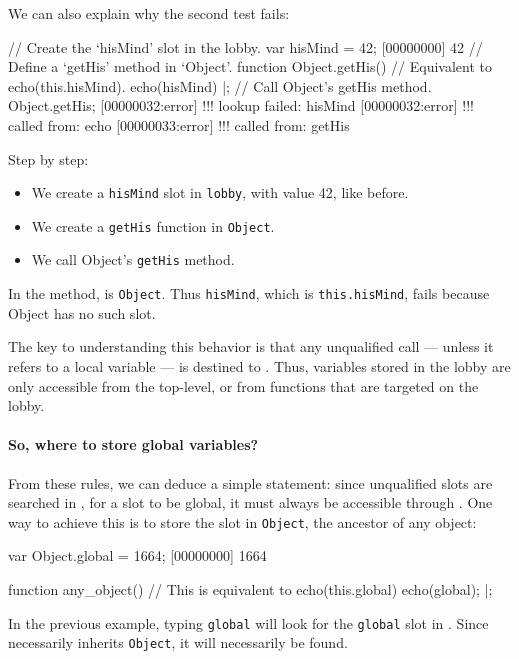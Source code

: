 We can also explain why the second test fails:

\begin{urbiscript}
// Create the `hisMind' slot in the lobby.
var hisMind = 42;
[00000000] 42
// Define a `getHis' method in `Object'.
function Object.getHis()
{
  // Equivalent to echo(this.hisMind).
  echo(hisMind)
}|;
// Call Object's getHis method.
Object.getHis;
[00000032:error] !!! lookup failed: hisMind
[00000032:error] !!!    called from: echo
[00000033:error] !!!    called from: getHis
\end{urbiscript}

Step by step:
\begin{itemize}
\item We create a \lstinline|hisMind| slot in \lstinline|lobby|, with
  value 42, like before.
\item We create a \lstinline|getHis| function in \lstinline|Object|.
\item We call Object's \lstinline|getHis| method.
\end{itemize}

In the method, \this is \lstinline|Object|. Thus
\lstinline|hisMind|, which is \lstinline|this.hisMind|, fails because
Object has no such slot.

The key to understanding this behavior is that any unqualified call
--- unless it refers to a local variable --- is destined to
\this. Thus, variables stored in the lobby are only
accessible from the top-level, or from functions that are targeted on
the lobby.

\paragraph{So, where to store global variables?}
From these rules, we can deduce a simple statement: since unqualified
slots are searched in \this, for a slot to be global, it
must always be accessible through \this. One way to achieve
this is to store the slot in \lstinline|Object|, the ancestor of any
object:

\begin{urbiscript}
var Object.global = 1664;
[00000000] 1664

function any_object()
{
  // This is equivalent to echo(this.global)
  echo(global);
}|;
\end{urbiscript}

In the previous example, typing \lstinline|global| will look for the
\lstinline|global| slot in \this. Since \this
necessarily inherits \lstinline|Object|, it will necessarily be found.


